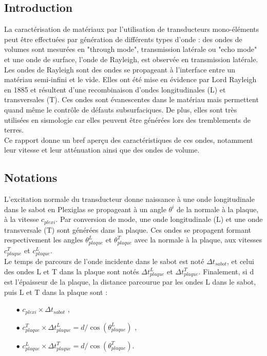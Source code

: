 \documentclass[twoside]{article}
\begin{document}
\begin{multicols}{2} %

\section{Introduction}
La caractérisation de matériaux par l'utilisation de transducteurs mono-éléments peut être effectuées par génération de différents types d'onde : des ondes de volumes sont mesurées en "through mode", transmission latérale ou "echo mode" et une onde de surface, l'onde de Rayleigh, est observée en transmission latérale.\\

 Les ondes de Rayleigh sont des ondes se propageant à l'interface entre un matériau semi-infini et le vide. Elles ont été mise en évidence par Lord Rayleigh en 1885 \cite{R} et résultent d'une recombinaison d'ondes longitudinales (L) et transversales (T). Ces ondes sont évanescentes dans le matériau mais permettent quand même le contrôle de défauts subsurfaciques. De plus, elles sont très utilisées en sismologie car elles peuvent être générées lors des tremblements de terres.\\

Ce rapport donne un bref aperçu des caractéristiques de ces ondes, notamment leur vitesse et leur atténuation ainsi que des ondes de volume.


\subsection*{Notations}

L'excitation normale du transducteur donne naissance à une onde longitudinale dans le sabot en Plexiglas se propageant à un angle $\theta^{i}$ de la normale à la plaque, à la vitesse $c_{plexi}$. Par conversion de mode, une onde longitudinale (L) et une onde transversale (T) sont générées dans la plaque. Ces ondes se propagent formant respectivement les angles $\theta_{plaque}^L$ et $\theta_{plaque}^T$ avec la normale à la plaque, aux vitesses $c_{plaque}^T$ et $c_{plaque}^L$.\\

Le temps de parcours de l'onde incidente dans le sabot est noté $\Delta t_{sabot}$, et celui des ondes L et T dans la plaque sont notés $\Delta t_{plaque}^L$ et $\Delta t_{plaque}^T$. Finalement, si d est l'épaisseur de la plaque, la distance parcourue par les ondes L dans le sabot, puis L et T dans la plaque sont : 
\begin{itemize}
	\item[$\bullet$] $c_{plexi} \times \Delta t_{sabot}$ , \\
	\item[$\bullet$] $c_{plaque}^T \times \Delta t_{plaque}^L = d/\cos(\theta_{plaque}^L)$ , \\
	\item[$\bullet$] $c_{plaque}^L \times \Delta t_{plaque}^T = d/\cos(\theta_{plaque}^T)$.
\end{itemize}


\end{multicols}
\end{document}

